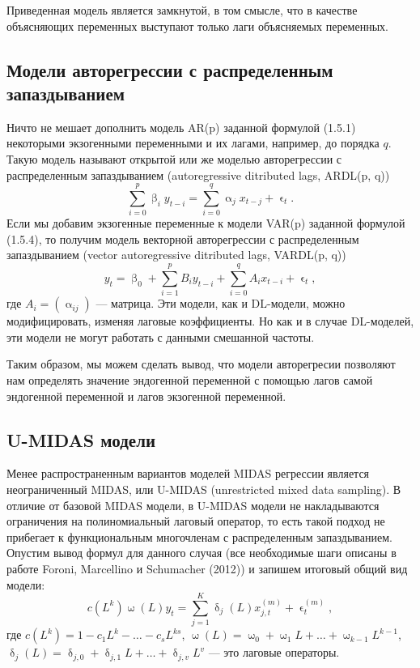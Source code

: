 \documentclass[a4paper, 12pt]{extarticle}
\numberwithin{equation}{subsection}
\renewcommand{\alpha}{\upalpha}
\renewcommand{\beta}{\upbeta}
\renewcommand{\delta}{\updelta}
\renewcommand{\omega}{\upomega}
\renewcommand{\epsilon}{\upvarepsilon}
\begin{document}
	Приведенная модель является замкнутой, в том смысле, что в качестве объясняющих переменных выступают только лаги объясняемых переменных. 
	\subsection{Модели авторегрессии с распределенным запаздыванием}
	Ничто не мешает дополнить модель AR(p) заданной формулой (1.5.1) некоторыми экзогенными переменными и их лагами, например, до порядка $q$. Такую модель называют открытой или же моделью авторегрессии с распределенным запаздыванием (autoregressive ditributed lags, ARDL(p, q))
	\begin{equation}
		\sum_{i=0}^{p} \beta_i y_{t-i}= \sum_{i=0}^{q}\alpha_j x_{t-j}+ \epsilon_t.
	\end{equation}
	Если мы добавим экзогенные переменные к модели VAR(p) заданной формулой (1.5.4), то получим модель векторной авторегрессии с распределенным запаздыванием (vector autoregressive ditributed lags, VARDL(p, q))
	\begin{equation}
		y_t = \beta_0 + \sum_{i=1}^{p}B_iy_{t-i} + \sum_{i=0}^{q}A_ix_{t-i} + \epsilon_t,
	\end{equation}
	где $A_i = (\alpha_{ij})$ --- матрица. Эти модели, как и DL-модели, можно модифицировать, изменяя лаговые коэффициенты. Но как и в случае DL-моделей, эти модели не могут работать с данными смешанной частоты.
	
	Таким образом, мы можем сделать вывод, что модели авторегресии позволяют нам определять значение эндогенной переменной с помощью лагов самой эндогенной переменной и лагов экзогенной переменной.
	\subsection{U-MIDAS модели}
	Менее распространенным вариантов моделей MIDAS регрессии является неограниченный MIDAS, или U-MIDAS (unrestricted mixed data sampling). В отличие от базовой MIDAS модели, в U-MIDAS модели не накладываются ограничения на полиномиальный лаговый оператор, то есть такой подход не прибегает к функциональным многочленам с распределенным запаздыванием. Опустим вывод формул для данного случая (все необходимые шаги описаны в работе Foroni, Marcellino и Schumacher (2012)) и запишем итоговый общий вид модели:
	\begin{equation}
		c(L^k)\omega(L)y_t = \sum_{j=1}^{K}\delta_j(L)x_{j,t}^{(m)} + \epsilon_t^{(m)},
	\end{equation}
	где $c(L^k) = 1-c_1L^k - \ldots - c_sL^{ks}$, $\omega(L) = \omega_0 + \omega_1L + \ldots + \omega_{k-1}L^{k-1}$, $\delta_j(L) = \delta_{j,0} + \delta_{j,1}L + \ldots + \delta_{j,v}L^v$ --- это лаговые операторы.
	
\end{document}
